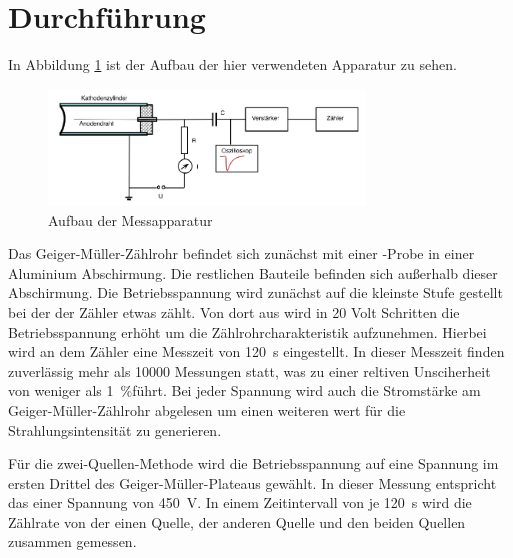 \section{Durchführung}
In Abbildung \ref{fig:01_teo} ist der Aufbau der hier verwendeten Apparatur zu sehen.
\begin{figure}
    \centering
    \includegraphics[width = 0.75\textwidth]{14_v703/Abbildungen/Seite 2.pdf}
    \caption{Aufbau der Messapparatur \cite{man:v703}}
    \label{fig:01_teo}
\end{figure}
Das Geiger-Müller-Zählrohr befindet sich zunächst mit einer -Probe in einer Aluminium Abschirmung.
Die restlichen Bauteile befinden sich außerhalb dieser Abschirmung.
Die Betriebsspannung wird zunächst auf die kleinste Stufe gestellt bei der der Zähler etwas zählt.
Von dort aus wird in 20 Volt Schritten die Betriebsspannung erhöht um die Zählrohrcharakteristik aufzunehmen.
Hierbei wird an dem Zähler eine Messzeit von \qty{120}{\s} eingestellt.
In dieser Messzeit finden zuverlässig mehr als \num{10000} Messungen statt, was zu einer reltiven Unsciherheit von weniger als \qty{1}{\percent}führt.
Bei jeder Spannung wird auch die Stromstärke am Geiger-Müller-Zählrohr abgelesen um einen weiteren wert für die Strahlungsintensität zu generieren.

Für die zwei-Quellen-Methode wird die Betriebsspannung auf eine Spannung im ersten Drittel des Geiger-Müller-Plateaus gewählt.
In dieser Messung entspricht das einer Spannung von \qty{450}{\volt}.
In einem Zeitintervall von je \qty{120}{\s} wird die Zählrate von der einen Quelle, der anderen Quelle und den beiden Quellen zusammen gemessen.
